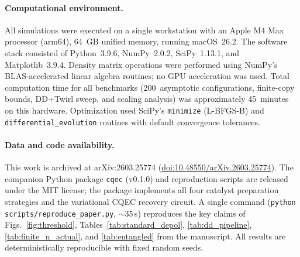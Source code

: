\documentclass[prx,twocolumn,superscriptaddress,longbibliography,floatfix]{revtex4-2}
\begin{document}
\paragraph*{Computational environment.}
All simulations were executed on a single workstation with an Apple M4 Max processor (arm64), 64~GB unified memory, running macOS~26.2.
The software stack consisted of Python~3.9.6, NumPy~2.0.2, SciPy~1.13.1, and Matplotlib~3.9.4.
Density matrix operations were performed using NumPy's BLAS-accelerated linear algebra routines; no GPU acceleration was used.
Total computation time for all benchmarks (200~asymptotic configurations, finite-copy bounds, DD+Twirl sweep, and scaling analysis) was approximately 45~minutes on this hardware.
Optimization used SciPy's \texttt{minimize} (L-BFGS-B) and \texttt{differential\_evolution} routines with default convergence tolerances.

\paragraph*{Data and code availability.}
This work is archived at arXiv:2603.25774 (\href{https://doi.org/10.48550/arXiv.2603.25774}{doi:10.48550/arXiv.2603.25774}).
The companion Python package \texttt{cqec} (v0.1.0) and reproduction scripts are released under the MIT license; the package implements all four catalyst preparation strategies and the variational CQEC recovery circuit.
A single command (\texttt{python scripts/reproduce\_paper.py}, $\sim$35\,s) reproduces the key claims of Figs.~\ref{fig:threshold}, Tables~\ref{tab:standard_depol}, \ref{tab:dd_pipeline}, \ref{tab:finite_n_actual}, and \ref{tab:entangled} from the manuscript.
All results are deterministically reproducible with fixed random seeds.

    
   
\end{document}
